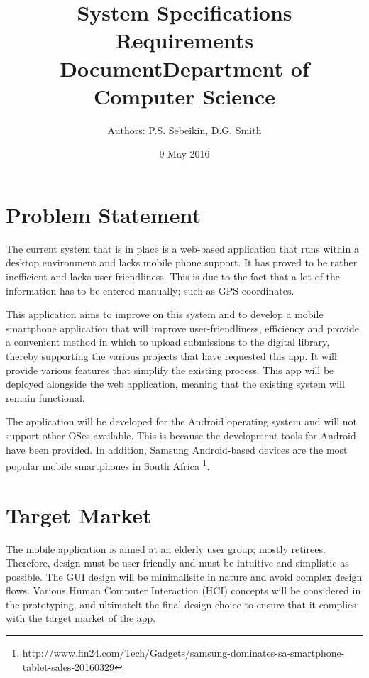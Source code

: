 \documentclass[12pt,a4paper,oneside]{article}
\begin{document}
\title{System Specifications Requirements Document\newline Department of Computer Science}
\author{Authors: P.S. Sebeikin, D.G. Smith}
\date {9 May 2016}
\maketitle
\pagebreak %

\section{Problem Statement}
  \begin{spacing}{1.4}
    The current system that is in place is a web-based application that runs within a desktop environment and lacks mobile phone support. It has proved to be rather inefficient and lacks user-friendliness. This is due to the fact that a lot of the information has to be entered manually; such as GPS coordinates.

    This application aims to improve on this system and to develop a mobile smartphone application that will improve user-friendliness, efficiency and provide a convenient method in which to upload submissions to the digital library, thereby supporting the various projects that have requested this app. It will provide various features that simplify the existing process. This app will be deployed alongside the web application, meaning that the existing system will remain functional.

    The application will be developed for the Android operating system and will not support other OSes available. This is because the development tools for Android have been provided. In addition, Samsung Android-based devices are the most popular mobile smartphones in South Africa \footnote{http://www.fin24.com/Tech/Gadgets/samsung-dominates-sa-smartphone-tablet-sales-20160329}.
  \end{spacing}

\section{Target Market}
  \begin{spacing}{1.4}
    The mobile application is aimed at an elderly user group; mostly retirees. Therefore, design must be user-friendly and must be intuitive and simplistic as possible. The GUI design will be minimalisitc in nature and avoid complex design flows. Various Human Computer Interaction (HCI) concepts will be considered in the prototyping, and ultimatelt the final design choice to ensure that it complies with the target market of the app.
  \end{spacing}
\end{document}
